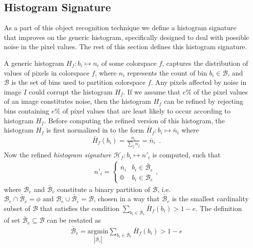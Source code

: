\documentclass {udthesis}
\begin{document}
\subsection{Histogram Signature}
\label{sec:hist_signature}

As a part of this object recognition technique we define a histogram signature that improves on the generic histogram, specifically designed to deal with possible noise in the pixel values. The rest of this section defines this histogram signature.

A generic histogram $H_f:b_i\mapsto n_i$ of some colorspace $f$, captures the distribution of values of pixels in colorspace $f$, where $n_i$ represents the count of bin $b_i \in \mathcal{B}$, and $\mathcal{B}$ is the set of bins used to partition colorspace $f$. Any pixels affected by noise in image $I$ could corrupt the histogram $H_f$. If we assume that $e\%$ of the pixel values of an image constitutes noise, then the histogram $H_f$ can be refined by rejecting bins containing $e\%$ of pixel values that are least likely to occur according to histogram $H_f$. Before computing the refined version of this histogram, the histogram $H_f$ is first normalized in to the form $\bar{H}_f:b_i\mapsto \bar{n}_i$ where
%
\begin{align}	\label{eqn:hist_norm}
 \bar{H}_f(b_i)=\frac{n_i}{\sum_{j}n_j}=\bar{n}_i \enspace.
\end{align}
Now the refined \emph{histogram signature} $\mathcal{H}_f:b_i\mapsto n'_i$ is computed, such that
\begin{align}
  n'_i = 
  \begin{cases}
     \bar{n}_i & b_i \in \bar{\mathcal{B}}_e\\
     0	&	b_i \in \mathcal{B}_e
  \end{cases},
\end{align}
%
where $\mathcal{B}_e$ and $\bar{\mathcal{B}}_e$ constitute a binary partition of $\mathcal{B}$, 
i.e. $\mathcal{B}_e \cap \bar{\mathcal{B}}_e = \phi \text{ and } 
\mathcal{B}_e \cup \bar{\mathcal{B}}_e = \mathcal{B}$,
chosen in a way that 
$\bar{\mathcal{B}}_e$ is the smallest cardinality subset of 
$\mathcal{B}$ that satisfies the condition $\sum_{b_i \in \bar{\mathcal{B}}_e} \bar{H}_f(b_i) > 1-e$. 
The definition of set $\bar{\mathcal{B}}_e\subseteq\mathcal{B}$ can be restated as
\begin{align}
 \bar{\mathcal{B}}_e=\underset{|\bar{\mathcal{B}_e}|} {\mathrm{argmin}} \sum_{b_i \in \bar{\mathcal{B}_e}} \bar{H}_f(b_i) > 1-e
\end{align}
\end{document}
